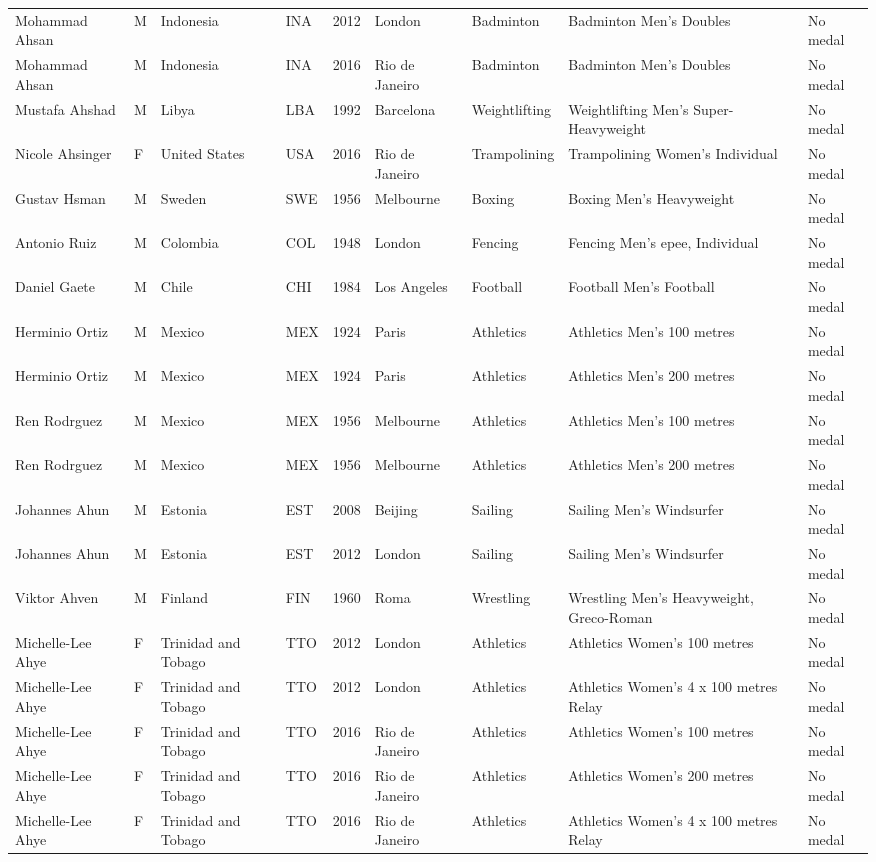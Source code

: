 \documentclass{article}%
\begin{document}
\begin{longtable}{p{1.5cm} p{0.5cm} p{2cm} p{1cm} p{1cm} p{1.5cm} p{1.5cm} p{5cm} p{1.5cm}}
Mohammad Ahsan&M&Indonesia&INA&2012&London&Badminton&Badminton Men's Doubles&No medal\\%
Mohammad Ahsan&M&Indonesia&INA&2016&Rio de Janeiro&Badminton&Badminton Men's Doubles&No medal\\%
Mustafa Ahshad&M&Libya&LBA&1992&Barcelona&Weightlifting&Weightlifting Men's Super{-}Heavyweight&No medal\\%
Nicole Ahsinger&F&United States&USA&2016&Rio de Janeiro&Trampolining&Trampolining Women's Individual&No medal\\%
Gustav Hsman&M&Sweden&SWE&1956&Melbourne&Boxing&Boxing Men's Heavyweight&No medal\\%
Antonio Ruiz&M&Colombia&COL&1948&London&Fencing&Fencing Men's epee, Individual&No medal\\%
Daniel Gaete&M&Chile&CHI&1984&Los Angeles&Football&Football Men's Football&No medal\\%
Herminio Ortiz&M&Mexico&MEX&1924&Paris&Athletics&Athletics Men's 100 metres&No medal\\%
Herminio Ortiz&M&Mexico&MEX&1924&Paris&Athletics&Athletics Men's 200 metres&No medal\\%
Ren Rodrguez&M&Mexico&MEX&1956&Melbourne&Athletics&Athletics Men's 100 metres&No medal\\%
Ren Rodrguez&M&Mexico&MEX&1956&Melbourne&Athletics&Athletics Men's 200 metres&No medal\\%
Johannes Ahun&M&Estonia&EST&2008&Beijing&Sailing&Sailing Men's Windsurfer&No medal\\%
Johannes Ahun&M&Estonia&EST&2012&London&Sailing&Sailing Men's Windsurfer&No medal\\%
Viktor Ahven&M&Finland&FIN&1960&Roma&Wrestling&Wrestling Men's Heavyweight, Greco{-}Roman&No medal\\%
Michelle{-}Lee Ahye&F&Trinidad and Tobago&TTO&2012&London&Athletics&Athletics Women's 100 metres&No medal\\%
Michelle{-}Lee Ahye&F&Trinidad and Tobago&TTO&2012&London&Athletics&Athletics Women's 4 x 100 metres Relay&No medal\\%
Michelle{-}Lee Ahye&F&Trinidad and Tobago&TTO&2016&Rio de Janeiro&Athletics&Athletics Women's 100 metres&No medal\\%
Michelle{-}Lee Ahye&F&Trinidad and Tobago&TTO&2016&Rio de Janeiro&Athletics&Athletics Women's 200 metres&No medal\\%
Michelle{-}Lee Ahye&F&Trinidad and Tobago&TTO&2016&Rio de Janeiro&Athletics&Athletics Women's 4 x 100 metres Relay&No medal\\%

\end{longtable}
\end{document}
